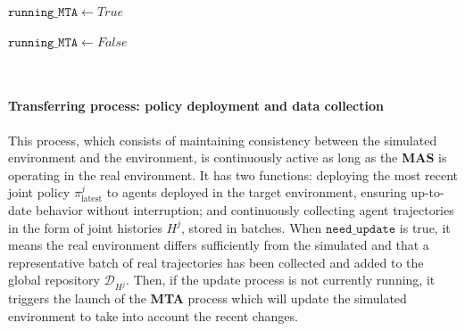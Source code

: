 \documentclass[pdflatex,sn-mathphys-num]{sn-jnl}%
\theoremstyle{thmstyleone}%
\theoremstyle{thmstyletwo}%
\theoremstyle{thmstylethree}%
\begin{document}
\begin{algorithm}[h!]
{    $\texttt{running\_MTA} \gets True$ 
    
    
    
    
    $\texttt{running\_MTA} \gets False$ 
    
    }
\end{algorithm}

\ \\[1.5em]

\paragraph*{Transferring process: policy deployment and data collection}

This process, which consists of maintaining consistency between the simulated environment and the environment, is continuously active as long as the \textbf{MAS} is operating in the real environment. It has two functions: deploying the most recent joint policy $\pi^j_{\text{latest}}$ to agents deployed in the target environment, ensuring up-to-date behavior without interruption; and continuously collecting agent trajectories in the form of joint histories $H^j$, stored in batches. When $\texttt{need\_update}$ is true, it means the real environment differs sufficiently from the simulated and that a representative batch of real trajectories has been collected and added to the global repository $\mathcal {D}_{H^j}$. Then, if the update process is not currently running, it triggers the launch of the \textbf{MTA} process which will update the simulated environment to take into account the recent changes.
\end{document}
